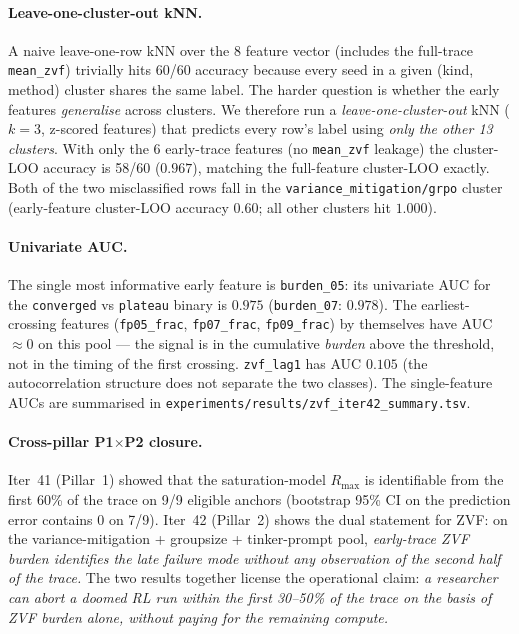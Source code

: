 \paragraph{Leave-one-cluster-out kNN.}
A naive leave-one-row kNN over the 8 feature vector
(includes the full-trace \texttt{mean\_zvf}) trivially hits 60/60
accuracy because every seed in a given (kind, method) cluster shares
the same label. The harder question is whether the early features
\emph{generalise} across clusters. We therefore run a
\emph{leave-one-cluster-out} kNN ($k{=}3$, z-scored features) that
predicts every row's label using \emph{only the other 13 clusters}.
With only the 6 early-trace features (no \texttt{mean\_zvf} leakage)
the cluster-LOO accuracy is 58/60 ($0.967$), matching the full-feature
cluster-LOO exactly. Both of the two misclassified rows fall in the
\texttt{variance\_mitigation/grpo} cluster (early-feature cluster-LOO
accuracy $0.60$; all other clusters hit $1.000$).

\paragraph{Univariate AUC.}
The single most informative early feature is \texttt{burden\_05}: its
univariate AUC for the \texttt{converged} vs \texttt{plateau} binary
is $0.975$ (\texttt{burden\_07}: $0.978$). The earliest-crossing
features (\texttt{fp05\_frac}, \texttt{fp07\_frac}, \texttt{fp09\_frac})
by themselves have AUC $\approx 0$ on this pool --- the signal is in
the cumulative \emph{burden} above the threshold, not in the timing
of the first crossing. \texttt{zvf\_lag1} has AUC $0.105$ (the
autocorrelation structure does not separate the two classes). The
single-feature AUCs are summarised in
\texttt{experiments/results/zvf_iter42_summary.tsv}.

\paragraph{Cross-pillar P1$\times$P2 closure.}
Iter~41 (Pillar~1) showed that the saturation-model $R_{\max}$ is
identifiable from the first 60\% of the trace on 9/9 eligible anchors
(bootstrap 95\% CI on the prediction error contains 0 on 7/9). Iter~42
(Pillar~2) shows the dual statement for ZVF: on the
variance-mitigation + groupsize + tinker-prompt pool,
\emph{early-trace ZVF burden identifies the late failure mode without
any observation of the second half of the trace.} The two results
together license the operational claim: \emph{a researcher can
abort a doomed RL run within the first 30--50\% of the trace on the
basis of ZVF burden alone, without paying for the remaining compute.}

